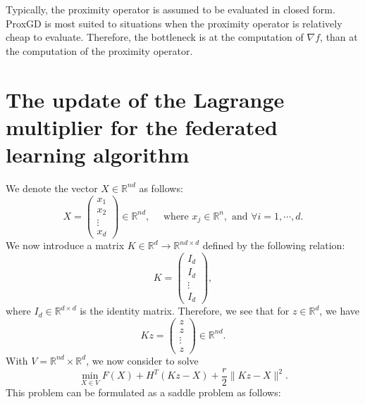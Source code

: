 \begin{itemize}
\begin{remark}
Typically, the proximity operator is assumed to be evaluated in closed form. ProxGD is most suited to situations when the proximity operator is relatively cheap to evaluate. Therefore, the bottleneck is at the computation of $\nabla f$, than at the computation of the proximity operator. 
\end{remark}


\section{The update of the Lagrange multiplier for the federated learning algorithm} 

We denote the vector $X \in \mathbb{R}^{nd}$ as follows: 
\begin{equation}
X = \left ( \begin{array}{c} x_1 \\ x_2 \\ \vdots \\ x_d \end{array} \right ) \in \mathbb{R}^{nd}, \quad \mbox{ where } x_j \in \mathbb{R}^{n}, \mbox{ and } \forall i=1,\cdots,d. 
\end{equation}
We now introduce a matrix $K \in \mathbb{R}^{d} \rightarrow \mathbb{R}^{nd \times d}$ defined by the following relation: 
\begin{equation} 
K = \left ( \begin{array}{c} I_d \\ I_d \\ \vdots \\ I_d \end{array} \right ), 
\end{equation}
where $I_d \in \mathbb{R}^{d\times d}$ is the identity matrix. Therefore, we see that for $z \in \mathbb{R}^{d}$, we have 
\begin{equation} 
K z = \left ( \begin{array}{c} z \\ z \\ \vdots \\ z \end{array} \right ) \in \mathbb{R}^{nd}. 
\end{equation} 
With $V = \mathbb{R}^{nd} \times \mathbb{R}^d$, we now consider to solve 
\begin{equation} 
\min_{X \in V } F(X) + H^T(Kz - X) + \frac{r}{2} \|Kz - X\|^2. 
\end{equation} 
This problem can be formulated as a saddle problem as follows: 

\end{itemize}
